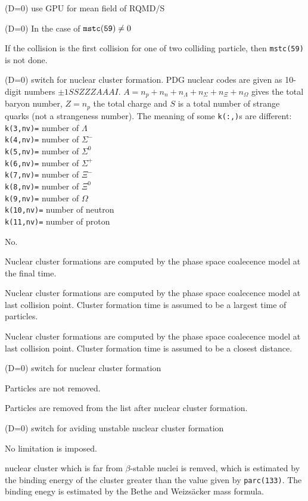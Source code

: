 \documentclass[]{article}
\newenvironment{entry}%
{\begin{list}{}{\setlength{\topsep}{0mm} \setlength{\itemsep}{0mm}
\setlength{\parskip}{0mm} \setlength{\parsep}{0mm}
\setlength{\leftmargin}{20mm} \setlength{\rightmargin}{0mm}
\setlength{\labelwidth}{18mm} \setlength{\labelsep}{2mm}}}%
{\end{list}}
\newenvironment{subentry}%
{\begin{list}{}{\setlength{\topsep}{0mm} \setlength{\itemsep}{0mm}
\setlength{\parskip}{0mm} \setlength{\parsep}{0mm}
\setlength{\leftmargin}{10mm} \setlength{\rightmargin}{0mm}
\setlength{\labelwidth}{18mm} \setlength{\labelsep}{2mm}}}%
{\end{list}}
\newcommand{\ttt}[1]{{\tt#1}}
\newcommand{\itemt}[1]{\item[{\tt #1}\hfill]}
\begin{document}
\begin{entry}
\itemt{mstc(129) :}(D=0) use GPU for mean field of RQMD/S

\itemt{mstc(130) :}(D=0) In the case of ${\tt mstc(59)}\ne0$
 \begin{subentry}
    \itemt{$=1$ :} If the collision is the first collision for
            one of two colliding particle, then {\tt mstc(59)} is not
	    done.
 \end{subentry}

\itemt{mstc(131) :}(D=0) switch for nuclear cluster formation.
PDG nuclear codes are given as 10-digit numbers $\pm1SSZZZAAAI$.
$A = n_p + n_n + n_\Lambda + n_\Sigma + n_\Xi + n_\Omega$ gives the total baryon number,
$Z = n_p$ the total charge and
$S$ is a total number of strange quarks (not a strangeness number).
The meaning of some \ttt{k(:,)}s are different:\\
\ttt{k(3,nv)=} number of $\Lambda$\\
\ttt{k(4,nv)=} number of $\Sigma^-$\\
\ttt{k(5,nv)=} number of $\Sigma^0$\\
\ttt{k(6,nv)=} number of $\Sigma^+$\\
\ttt{k(7,nv)=} number of $\Xi^-$\\
\ttt{k(8,nv)=} number of $\Xi^0$\\
\ttt{k(9,nv)=} number of $\Omega$\\
\ttt{k(10,nv)=} number of neutron\\
\ttt{k(11,nv)=} number of proton

 \begin{subentry}
    \itemt{$=0$ :} No.
    \itemt{$=1$ :} Nuclear cluster formations are computed by the
    phase space coalecence model at the final time.
    \itemt{$=2$ :} Nuclear cluster formations are computed by the
    phase space coalecence model at last collision point.
    Cluster formation time is assumed to be a largest time of particles.
    \itemt{$=3$ :} Nuclear cluster formations are computed by the
    phase space coalecence model at last collision point.
    Cluster formation time is assumed to be a closest distance.
 \end{subentry}

\itemt{mstc(132) :}(D=0) switch for nuclear cluster formation
 \begin{subentry}
    \itemt{$=0$ :} Particles are not removed.
    \itemt{$=1$ :} Particles are removed from the list after nuclear cluster formation.
 \end{subentry}

\itemt{mstc(133) :}(D=0) switch for aviding unstable nuclear cluster formation
 \begin{subentry}
    \itemt{$=0$ :} No limitation is imposed.
    \itemt{$=1$ :} nuclear cluster which is far from $\beta$-stable nuclei is
    remved, which is estimated by the binding energy of the cluster greater
than the value given by \ttt{parc(133)}. The binding enegy is estimated by
the Bethe and Weizs\"acker mass formula.
 \end{subentry}


\end{entry}
\end{document}
